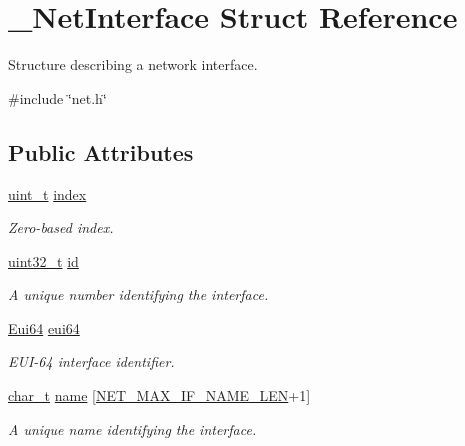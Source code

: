 \hypertarget{struct__NetInterface}{}\section{\+\_\+\+Net\+Interface Struct Reference}
\label{struct__NetInterface}


Structure describing a network interface.  




{\ttfamily \#include \char`\"{}net.\+h\char`\"{}}

\subsection*{Public Attributes}
\begin{DoxyCompactItemize}
\item 
\hyperlink{compiler__port_8h_a12a1e9b3ce141648783a82445d02b58d}{uint\+\_\+t} \hyperlink{struct__NetInterface_a9eb2e832ba1078f3b5aff061d7e1404c}{index}
\begin{DoxyCompactList}\small\item\em Zero-\/based index. \end{DoxyCompactList}\item 
\hyperlink{stdint_8h_a435d1572bf3f880d55459d9805097f62}{uint32\+\_\+t} \hyperlink{struct__NetInterface_aece6aed08d5e6b93f3df55bb2f7374f7}{id}
\begin{DoxyCompactList}\small\item\em A unique number identifying the interface. \end{DoxyCompactList}\item 
\hyperlink{ethernet_8h_acbcae3afd042b3ce97e42f54013c8137}{Eui64} \hyperlink{struct__NetInterface_a36a2f0e5c4a22325ad85efc69a6fbfa6}{eui64}
\begin{DoxyCompactList}\small\item\em E\+U\+I-\/64 interface identifier. \end{DoxyCompactList}\item 
\hyperlink{compiler__port_8h_a40bb5262bf908c328fbcfbe5d29d0201}{char\+\_\+t} \hyperlink{struct__NetInterface_ab11ae4ef7d7767dd1ab2fbebbcb51e43}{name} \mbox{[}\hyperlink{net_8h_a2064ee62d318037f2c1168cab858c852}{N\+E\+T\+\_\+\+M\+A\+X\+\_\+\+I\+F\+\_\+\+N\+A\+M\+E\+\_\+\+L\+EN}+1\mbox{]}
\begin{DoxyCompactList}\small\item\em A unique name identifying the interface. \end{DoxyCompactList}\item 

\end{DoxyCompactItemize}
